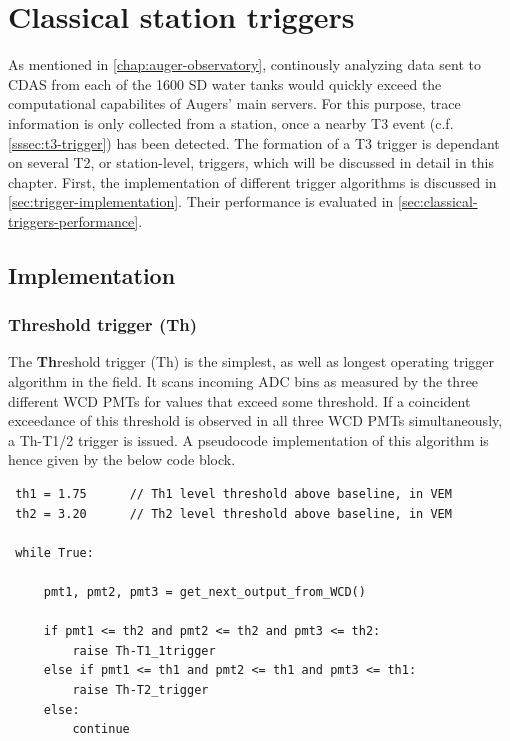
\chapter{Classical station triggers}
\label{chap:classical-triggers}

As mentioned in \autoref{chap:auger-observatory}, continously analyzing data sent to CDAS from each of the 1600 SD water tanks would quickly exceed the 
computational capabilites of Augers' main servers. For this purpose, trace information is only collected from a station, once a nearby T3 event 
(c.f. \autoref{sssec:t3-trigger}) has been detected. The formation of a T3 trigger is dependant on several T2, or station-level, triggers, which will
be discussed in detail in this chapter. First, the implementation of different trigger algorithms is discussed in \autoref{sec:trigger-implementation}.
Their performance is evaluated in \autoref{sec:classical-triggers-performance}.

\section{Implementation}
\label{sec:trigger-implementation}

\subsection{Threshold trigger (Th)}
\label{ssec:threshold-trigger}

The \textbf{Th}reshold trigger (Th) is the simplest, as well as longest operating trigger algorithm \cite{triggerGuide} in the field. It scans incoming 
ADC bins as measured by the three different WCD PMTs for values that exceed some threshold. If a coincident exceedance of this threshold is observed in 
all three WCD PMTs simultaneously, a Th-T1/2 trigger is issued. A pseudocode implementation of this algorithm is hence given by the below code block.

\begin{lstlisting}
 th1 = 1.75      // Th1 level threshold above baseline, in VEM   
 th2 = 3.20      // Th2 level threshold above baseline, in VEM  

 while True:

     pmt1, pmt2, pmt3 = get_next_output_from_WCD()

     if pmt1 <= th2 and pmt2 <= th2 and pmt3 <= th2:
         raise Th-T1_1trigger
     else if pmt1 <= th1 and pmt2 <= th1 and pmt3 <= th1:
         raise Th-T2_trigger
     else: 
         continue
\end{lstlisting}

